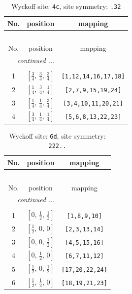 \documentclass[fleqn,8pt]{jsarticle}
\begin{document}
\renewcommand{\arraystretch}{1.2}
\begin{longtable}{ccc}
\caption{Wyckoff site: {\tt 4c}, site symmetry: {\tt .32}}
 \\
 \hline \hline
No. & position & mapping \\ \hline \endfirsthead

\multicolumn{2}{l}{\tablename\ \thetable{}} \\
 \hline \hline
No. & position & mapping \\ \hline \endhead

 \hline \hline
\multicolumn{2}{r}{\footnotesize\it continued ...} \\ \endfoot

 \hline \hline
\multicolumn{2}{r}{} \\ \endlastfoot

1 & $\left[ \frac{3}{4},\, \frac{3}{4},\, \frac{3}{4} \right]$ & {\tt [1,12,14,16,17,18]} \\ \hline
2 & $\left[ \frac{1}{4},\, \frac{3}{4},\, \frac{1}{4} \right]$ & {\tt [2,7,9,15,19,24]} \\ \hline
3 & $\left[ \frac{1}{4},\, \frac{1}{4},\, \frac{3}{4} \right]$ & {\tt [3,4,10,11,20,21]} \\ \hline
4 & $\left[ \frac{3}{4},\, \frac{1}{4},\, \frac{1}{4} \right]$ & {\tt [5,6,8,13,22,23]} \\
\end{longtable}
\renewcommand{\arraystretch}{1.2}
\begin{longtable}{ccc}
\caption{Wyckoff site: {\tt 6d}, site symmetry: {\tt 222..}}
 \\
 \hline \hline
No. & position & mapping \\ \hline \endfirsthead

\multicolumn{2}{l}{\tablename\ \thetable{}} \\
 \hline \hline
No. & position & mapping \\ \hline \endhead

 \hline \hline
\multicolumn{2}{r}{\footnotesize\it continued ...} \\ \endfoot

 \hline \hline
\multicolumn{2}{r}{} \\ \endlastfoot

1 & $\left[ 0,\, \frac{1}{2},\, \frac{1}{2} \right]$ & {\tt [1,8,9,10]} \\ \hline
2 & $\left[ \frac{1}{2},\, 0,\, 0 \right]$ & {\tt [2,3,13,14]} \\ \hline
3 & $\left[ 0,\, 0,\, \frac{1}{2} \right]$ & {\tt [4,5,15,16]} \\ \hline
4 & $\left[ 0,\, \frac{1}{2},\, 0 \right]$ & {\tt [6,7,11,12]} \\ \hline
5 & $\left[ \frac{1}{2},\, 0,\, \frac{1}{2} \right]$ & {\tt [17,20,22,24]} \\ \hline
6 & $\left[ \frac{1}{2},\, \frac{1}{2},\, 0 \right]$ & {\tt [18,19,21,23]} \\
\end{longtable}
\end{document}
